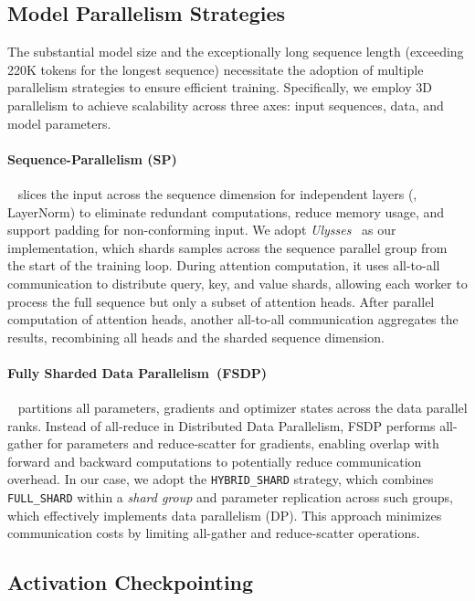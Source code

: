 \subsection{Model Parallelism Strategies}\label{sec:infra-model-parallel}
The substantial model size and the exceptionally long sequence length (exceeding 220K tokens for the longest sequence) necessitate the adoption of multiple parallelism strategies to ensure efficient training. Specifically, we employ 3D parallelism to achieve scalability across three axes: input sequences, data, and model parameters.


\paragraph{Sequence-Parallelism (SP)}~\citep{korthikanti2023reducing, li2021sequence, jacobs2023deepspeed} slices the input across the sequence dimension for independent layers (\eg, LayerNorm) to eliminate redundant computations, reduce memory usage, and support padding for non-conforming input. We adopt \textit{Ulysses}~\citep{jacobs2023deepspeed} as our implementation, which shards samples across the sequence parallel group from the start of the training loop. During attention computation, it uses all-to-all communication to distribute query, key, and value shards, allowing each worker to process the full sequence but only a subset of attention heads. After parallel computation of attention heads, another all-to-all communication aggregates the results, recombining all heads and the sharded sequence dimension.

\paragraph{Fully Sharded Data Parallelism~(FSDP)}~\citep{pytorch_fsdp} partitions all parameters, gradients and optimizer states across the data parallel ranks. Instead of all-reduce in Distributed Data Parallelism, FSDP performs all-gather for parameters and reduce-scatter for gradients, enabling overlap with forward and backward computations to potentially reduce communication overhead. In our case, we adopt the \texttt{HYBRID\_SHARD} strategy, which combines \texttt{FULL\_SHARD} within a \emph{shard group} and parameter replication across such groups, which effectively implements data parallelism (DP). This approach minimizes communication costs by limiting all-gather and reduce-scatter operations.


\subsection{Activation Checkpointing}\label{sec:infra-ac}

